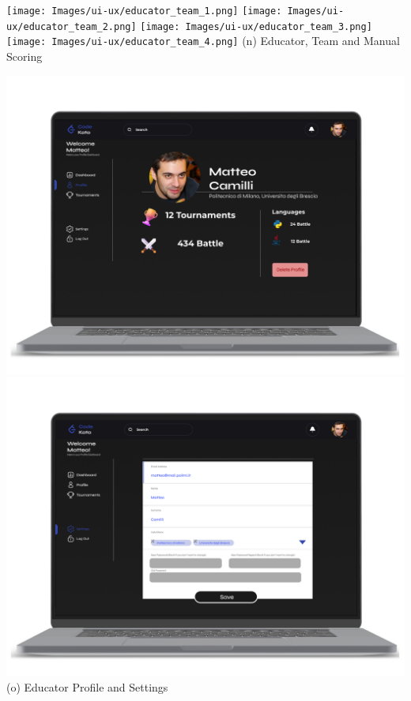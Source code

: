 \newpage
\begin{center}
\texttt{[image: Images/ui-ux/educator\_team\_1.png]}
\texttt{[image: Images/ui-ux/educator\_team\_2.png]}
\texttt{[image: Images/ui-ux/educator\_team\_3.png]}
\texttt{[image: Images/ui-ux/educator\_team\_4.png]}
        (n) Educator, Team and Manual Scoring
\end{center}
\begin{center}
\includegraphics[scale=0.13]{Images/ui-ux/educator_profile.png}
\includegraphics[scale=0.13]{Images/ui-ux/educator_settings.png}
        (o) Educator Profile and Settings
\end{center}
\newpage

